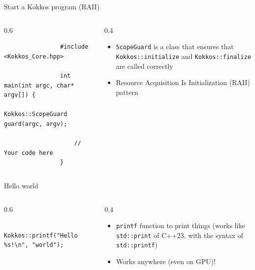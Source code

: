 \documentclass[
    aspectratio=169,
]{beamer}
\begin{document}
\begin{frame}[fragile]{Start a Kokkos program (RAII)}
    \begin{columns}
        \begin{column}{0.6\linewidth}
            \begin{verbatim}
                #include <Kokkos_Core.hpp>

                int main(int argc, char* argv[]) {
                    Kokkos::ScopeGuard guard(argc, argv);

                    // Your code here
                }
            \end{verbatim}
        \end{column}
        \begin{column}{0.4\linewidth}
            \begin{itemize}
                \item \texttt{ScopeGuard} is a class that ensures that \texttt{Kokkos::initialize} and \texttt{Kokkos::finalize} are called correctly
                \item Resource Acquisition Is Initialization (RAII) pattern
            \end{itemize}
        \end{column}
    \end{columns}
\end{frame}

\begin{frame}[fragile]{Hello world}
    \begin{columns}
        \begin{column}{0.6\linewidth}
            \begin{verbatim}
                Kokkos::printf("Hello %s!\n", "world");
            \end{verbatim}
        \end{column}
        \begin{column}{0.4\linewidth}
            \begin{itemize}
                \item \texttt{printf} function to print things (works like \texttt{std::print} of C++23, with the syntax of \texttt{std::printf})
                \item Works anywhere (even on GPU)!
            \end{itemize}
        \end{column}
    \end{columns}
\end{frame}
\end{document}
